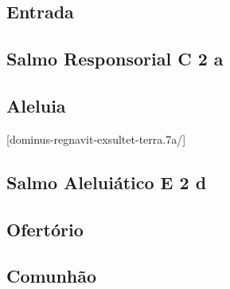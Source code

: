 
\subsection{Entrada}\label{subsection:proprium-sanctorum/in-transfiguratione-domini/introitus}
\def\AntiphonAnnotatio{\CantusID{001501}[Mt 17,1]}

\AllowPageFlush

\subsection[Salmo Responsorial]{Salmo Responsorial \textmd{C 2 a}}\label{subsection:proprium-sanctorum/in-transfiguratione-domini/psalmus-responsorius}

\AllowPageFlush

\subsection{Aleluia}\label{subsection:proprium-sanctorum/in-transfiguratione-domini/alleluia}
[dominus-regnavit-exsultet-terra.7a/]

\AllowPageFlush

\subsection[Salmo Aleluiático]{Salmo Aleluiático \textmd{E 2 d}}\label{subsection:proprium-sanctorum/in-transfiguratione-domini/psalmus-alleluiaticus}

\AllowPageFlush

\subsection{Ofertório}\label{subsection:proprium-sanctorum/in-transfiguratione-domini/offertorium}

\AllowPageFlush

\subsection{Comunhão}\label{subsection:proprium-sanctorum/in-transfiguratione-domini/communio}
